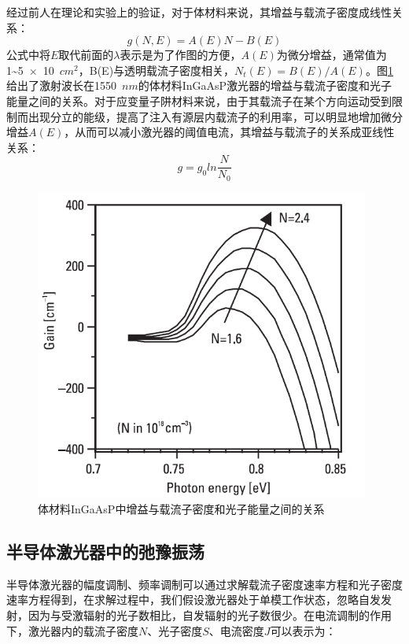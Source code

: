 经过前人在理论和实验上的验证，对于体材料来说，其增益与载流子密度成线性关系：
\begin{equation}
\label{bulk_material_gain_equation}
g(N,E) = A(E)N-B(E)
\end{equation}
公式中将$E$取代前面的$\lambda$表示是为了作图的方便，$A(E)$为微分增益，通常值为1\~{}5~$\times$~10~$cm^{2}$，B(E)与透明载流子密度相关，$N_t(E)=B(E)/A(E)$。图\ref{bulk_material_gain}给出了激射波长在1550~$nm$的体材料InGaAsP激光器的增益与载流子密度和光子能量之间的关系。对于应变量子阱材料来说，由于其载流子在某个方向运动受到限制而出现分立的能级，提高了注入有源层内载流子的利用率，可以明显地增加微分增益$A(E)$，从而可以减小激光器的阈值电流，其增益与载流子的关系成亚线性关系：
\begin{equation}
\label{quantum_material_gain}
g = g_0ln\dfrac{N}{N_0}
\end{equation}

\begin{figure}[htb]
	\centering
	\includegraphics[width=11cm]{./Pictures/fab_bulk_material_gain.png}
	\captionsetup{justification=centering}
	\caption{体材料InGaAsP中增益与载流子密度和光子能量之间的关系\cite{morthier2013handbook}}
	\label{bulk_material_gain}
\end{figure}

\subsection{半导体激光器中的弛豫振荡}
半导体激光器的幅度调制、频率调制可以通过求解载流子密度速率方程和光子密度速率方程得到，在求解过程中，我们假设激光器处于单模工作状态，忽略自发发射，因为与受激辐射的光子数相比，自发辐射的光子数很少。在电流调制的作用下，激光器内的载流子密度$N$、光子密度$S$、电流密度$J$可以表示为：

